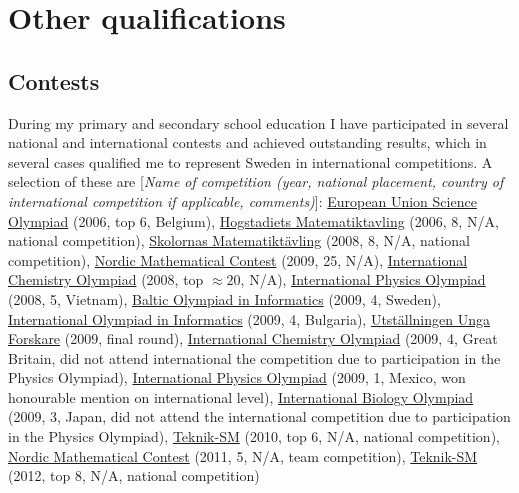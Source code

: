 \section*{Other qualifications}

\subsection*{Contests}
During my primary and secondary school education I have participated in several national and international contests and achieved outstanding results, which in several cases qualified me to represent Sweden in international competitions. A selection of these are [\emph{Name of competition (year, national placement, country of international competition if applicable, comments)}]: 
\uline{European Union Science Olympiad} (2006, top 6, Belgium), \hspace{0.07cm}
\uline{Hogstadiets Matematiktavling} (2006, 8, N/A, national competition), \hspace{0.07cm}
\uline{Skolornas Matematiktävling} (2008, 8, N/A, national competition), \hspace{0.07cm}
\uline{Nordic Mathematical Contest} (2009, 25, N/A), \hspace{0.07cm}
\uline{International Chemistry Olympiad} (2008, top $\approx 20$, N/A), \hspace{0.07cm}
\uline{International Physics Olympiad} (2008, 5, Vietnam), \hspace{0.07cm}
\uline{Baltic Olympiad in Informatics} (2009, 4, Sweden), \hspace{0.07cm}
\uline{International Olympiad in Informatics} (2009, 4, Bulgaria), \hspace{0.07cm}
\uline{Utställningen Unga Forskare} (2009, final round), \hspace{0.07cm}
\uline{International Chemistry Olympiad} (2009, 4, Great Britain, did not attend international the competition due to participation in the Physics Olympiad), \hspace{0.07cm}
\uline{International Physics Olympiad} (2009, 1, Mexico, won honourable mention on international level), \hspace{0.07cm}
\uline{International Biology Olympiad} (2009, 3, Japan, did not attend the international competition due to participation in the Physics Olympiad), \hspace{0.07cm}
\uline{Teknik-SM} (2010, top 6, N/A, national competition), \hspace{0.07cm}
\uline{Nordic Mathematical Contest} (2011, 5, N/A, team competition), \hspace{0.07cm}
\uline{Teknik-SM} (2012, top 8, N/A, national competition)

